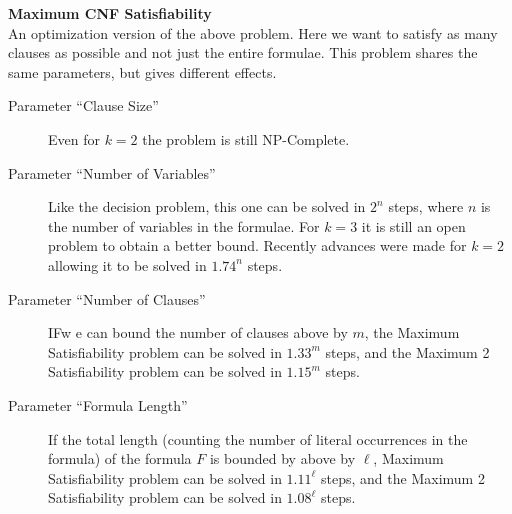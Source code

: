 \noindent \textbf{Maximum CNF Satisfiability}\\
An optimization version of the above problem. Here we want to satisfy as many clauses as possible and
not just the entire formulae. This problem shares the same parameters, but gives different effects.

\begin{description}
\item[Parameter ``Clause Size''] Even for $k = 2$ the problem is still NP-Complete.

\item[Parameter ``Number of Variables''] Like the decision problem, this one can be solved in $2^n$
  steps, where $n$ is the number of variables in the formulae. For $k=3$ it is still an open problem to obtain a better bound.
  Recently advances were made for $k=2$ allowing it to be solved in $1.74^n$ steps.

\item[Parameter ``Number of Clauses''] IFw e can bound the number of clauses above by $m$, the Maximum
Satisfiability problem can be solved in $1.33^m$ steps, and the Maximum 2 Satisfiability problem can be solved in $1.15^m$ steps.

\item[Parameter ``Formula Length''] If the total length (counting the number of
  literal occurrences in the formula) of the formula $F$ is bounded by above by
  $\ell$, Maximum Satisfiability problem can be solved in $1.11^\ell$ steps, and the Maximum 2 Satisfiability problem can be solved in $1.08^\ell$ steps.
\end{description}


